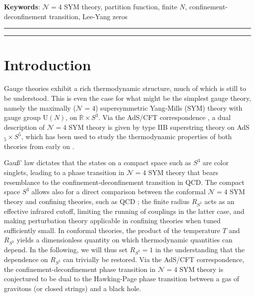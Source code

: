 \documentclass[a4paper,11pt]{article}
\begin{document}
\bigskip\bigskip\par\noindent
{\bf Keywords}: $\mathcal{N}=4$ SYM theory, partition function, finite $N$, confinement-deconfinement transition, Lee-Yang zeros

\thispagestyle{empty}

\newpage
\hrule
\tableofcontents
\afterTocSpace
\hrule
\afterTocRuleSpace



\section{Introduction}
\label{sec: intro}

Gauge theories exhibit a rich thermodynamic structure, much of which is still to be understood.
This is even the case for what might be the simplest gauge theory, namely the maximally ($\mathcal{N}=4$) supersymmetric Yang-Mills (SYM) theory with gauge group $\text{U}(N)$, on $\mathbb{R}\times S^3$.
Via the AdS/CFT correspondence \cite{Maldacena:1997re}, a dual description of $\mathcal{N}=4$ SYM theory is given by type IIB superstring theory on AdS${}_5\times S^5$, which has been used to study the thermodynamic properties of both theories from early on \cite{Witten:1998zw}.

Gauß' law dictates that the states on a compact space such as $S^3$ are color singlets, leading to a phase transition in $\mathcal{N}=4$ SYM theory that bears resemblance to the confinement-deconfinement transition in QCD. 
The compact space $S^3$ allows also for a direct comparison between the conformal $\mathcal{N}=4$ SYM theory and confining theories, such as QCD \cite{Aharony:2003sx}; the finite radius $R_{S^3}$ acts as an effective infrared cutoff, limiting the running of couplings in the latter case, and making perturbation theory applicable in confining theories when tuned sufficiently small.
In conformal theories, the product of the temperature $T$ and $R_{S^3}$ yields a dimensionless quantity on which thermodynamic quantities can depend. In the following, we will thus set $R_{S^3}=1$ in the understanding that the dependence on $R_{S^3}$ can trivially be restored.
% 
Via the  AdS/CFT correspondence, the confinement-deconfinement phase transition in $\mathcal{N}=4$ SYM theory is conjectured \cite{Witten:1998zw} to be dual to the Hawking-Page phase transition \cite{Hawking:1982dh} between a gas of gravitons (or closed strings) and a black hole.
\end{document}
